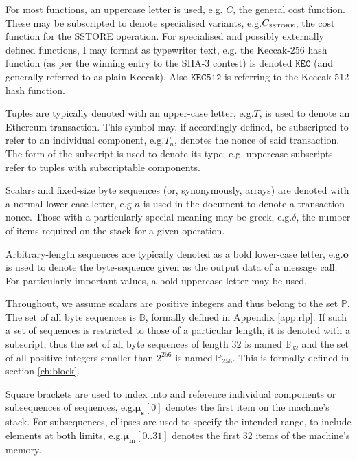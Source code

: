 \documentclass[9pt,oneside]{amsart}
\makeatletter
\newcommand*\eg{e.g.\@\xspace}
\makeatother
\begin{document}
\begin{multicols}{2}
For most functions, an uppercase letter is used, e.g. $C$, the general cost function. These may be subscripted to denote specialised variants, \eg $C_\text{\tiny SSTORE}$, the cost function for the {\tiny SSTORE} operation. For specialised and possibly externally defined functions, I may format as typewriter text, \eg the Keccak-256 hash function (as per the winning entry to the SHA-3 contest) is denoted $\texttt{KEC}$ (and generally referred to as plain Keccak). Also $\texttt{KEC512}$ is referring to the Keccak 512 hash function.

Tuples are typically denoted with an upper-case letter, \eg $T$, is used to denote an Ethereum transaction. This symbol may, if accordingly defined, be subscripted to refer to an individual component, \eg $T_n$, denotes the nonce of said transaction. The form of the subscript is used to denote its type; \eg uppercase subscripts refer to tuples with subscriptable components.

Scalars and fixed-size byte sequences (or, synonymously, arrays) are denoted with a normal lower-case letter, \eg $n$ is used in the document to denote a transaction nonce. Those with a particularly special meaning may be greek, \eg $\delta$, the number of items required on the stack for a given operation.

Arbitrary-length sequences are typically denoted as a bold lower-case letter, \eg $\mathbf{o}$ is used to denote the byte-sequence given as the output data of a message call. For particularly important values, a bold uppercase letter may be used.

Throughout, we assume scalars are positive integers and thus belong to the set $\mathbb{P}$. The set of all byte sequences is $\mathbb{B}$, formally defined in Appendix \ref{app:rlp}. If such a set of sequences is restricted to those of a particular length, it is denoted with a subscript, thus the set of all byte sequences of length $32$ is named $\mathbb{B}_{32}$ and the set of all positive integers smaller than $2^{256}$ is named $\mathbb{P}_{256}$. This is formally defined in section \ref{ch:block}.

Square brackets are used to index into and reference individual components or subsequences of sequences, \eg $\boldsymbol{\mu}_\mathbf{s}[0]$ denotes the first item on the machine's stack. For subsequences, ellipses are used to specify the intended range, to include elements at both limits, \eg $\boldsymbol{\mu}_\mathbf{m}[0..31]$ denotes the first 32 items of the machine's memory.


\end{multicols}
\end{document}
